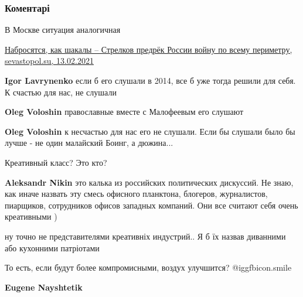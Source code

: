  
 
 
 
 
\subsubsection{Коментарі}
\label{sec:10_12_2021.fb.voloshin_oleg.opzzh.1.ustupki.cmt}

\begin{itemize} %
В Москве ситуация аналогичная

\href{https://sevastopol.su/news/nabrosyatsya-kak-shakaly-strelkov-predrek-rossii-voynu-po-vsemu-perimetru}{%
Набросятся, как шакалы – Стрелков предрёк России войну по всему периметру, sevastopol.su, 13.02.2021%
}

\begin{itemize} %
\textbf{Igor Lavrynenko} если б его слушали в 2014, все б уже тогда решили для себя. К счастью для нас, не слушали

\textbf{Oleg Voloshin} православные вместе с Малофеевым его слушают

\textbf{Oleg Voloshin} к несчастью для нас его не слушали. Если бы слушали было бы лучше - не один малайский Боинг, а дюжина...
\end{itemize} %

Креативный класс? Это кто?

\begin{itemize} %
\textbf{Aleksandr Nikin} это калька из российских политических дискуссий. Не знаю, как иначе назвать эту смесь офисного планктона, блогеров, журналистов, пиарщиков, сотрудников офисов западных компаний. Они все считают себя очень креативными )

ну точно не представителями креативніх индустрий.. Я б їх назвав диванними або кухонними патріотами
\end{itemize} %

То есть, если будут более компромисными, воздух улучшится?  @igg{fbicon.smile} 

\begin{itemize} %
\textbf{Eugene Nayshtetik} 


\end{itemize}
\end{itemize}
